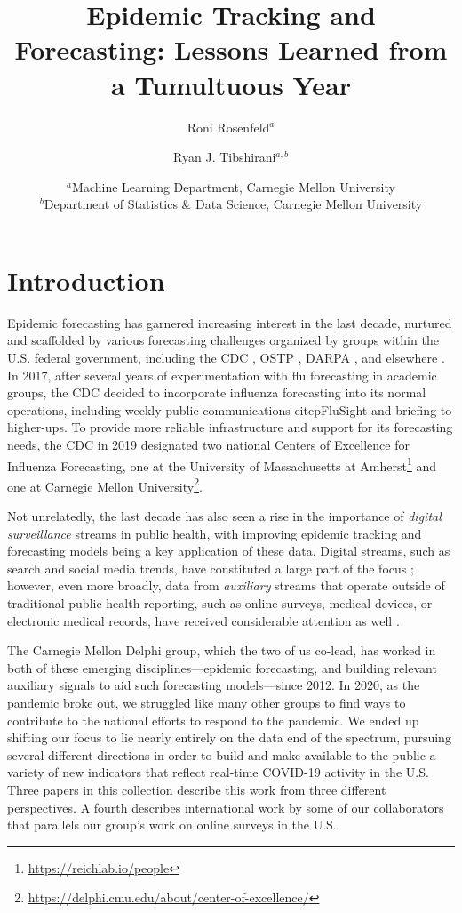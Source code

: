\documentclass{article}
\title{Epidemic Tracking and Forecasting: Lessons Learned from a Tumultuous Year}
\author{Roni Rosenfeld$^a$ \and Ryan J. Tibshirani$^{a,b}$}
\date{$^a$Machine Learning Department, Carnegie Mellon University \\ 
$^b$Department of Statistics \& Data Science, Carnegie Mellon University}
\begin{document}
\maketitle

\section{Introduction}

Epidemic forecasting has garnered increasing interest in the last decade,
nurtured and scaffolded by various forecasting challenges organized by groups
within the U.S. federal government, including the CDC \citep{Biggerstaff:2016,
  Biggerstaff:2018, Reich:2019}, OSTP \citep{Johansson:2019}, DARPA
\citep{DelValle:2018}, and elsewhere \citep{Ajelli:2018, Viboud:2018}.  In 2017,
after several years of experimentation with flu forecasting in academic groups,
the CDC decided to incorporate influenza forecasting into its normal operations,
including weekly public communications citep{FluSight} and briefing to
higher-ups.  To provide more reliable infrastructure and support for its
forecasting needs, the CDC in 2019 designated two national Centers of Excellence
for Influenza Forecasting, one at the University of Massachusetts at
Amherst\footnote{\url{https://reichlab.io/people}} and one at Carnegie Mellon
University\footnote{\url{https://delphi.cmu.edu/about/center-of-excellence/}}. 

Not unrelatedly, the last decade has also seen a rise in the importance of
\emph{digital surveillance} streams in public health, with improving epidemic
tracking and forecasting models being a key application of these data.  Digital
streams, such as search and social media trends, have constituted a large part
of the focus \citep{Ginsberg:2009, Brownstein:2009, Salathe:2012,
Kass-Hout:2013, Santillana:2015, Paul:2017}; however, even more broadly, data
from \emph{auxiliary} streams that operate outside of traditional public health
reporting, such as online surveys, medical devices, or electronic medical
records, have received considerable attention as well \citep{Kass-Hout:2011,
Carlson:2013, Viboud:2014, Smolinski:2015, Santillana:2016, Charu:2017,
Koppeschaar:2017, Yang:2019, Leuba:2020, Radin:2020, Ackley:2020}.

The Carnegie Mellon Delphi group, which the two of us co-lead, has worked in
both of these emerging disciplines---epidemic forecasting, and building relevant
auxiliary signals to aid such forecasting models---since 2012.  In 2020, as the
pandemic broke out, we struggled like many other groups to find ways to
contribute to the national efforts to respond to the pandemic.  We ended up
shifting our focus to lie nearly entirely on the data end of the spectrum,
pursuing several different directions in order to build and make available to
the public a variety of new indicators that reflect real-time COVID-19 activity
in the U.S.  Three papers in this collection describe this work from three
different perspectives.  A fourth describes international work by some of our
collaborators that parallels our group's work on online surveys in the U.S.  
\end{document}
